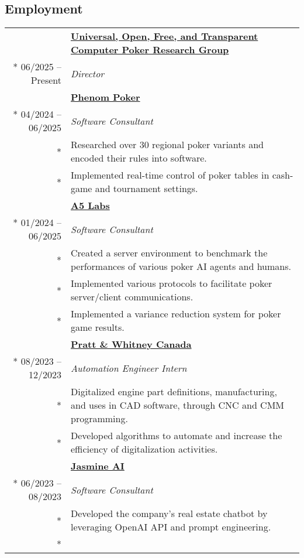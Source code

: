 \documentclass{article}
\begin{document}
	\subsection*{Employment}

	\begin{tabularx}{\textwidth}{r X}
		& \textbf{\href{https://uoftcprg.com/}{Universal, Open, Free, and Transparent Computer Poker Research Group}} \\*
		06/2025 -- Present & \textit{Director} \\
		\addlinespace
		& \textbf{\href{https://www.phenompoker.com/}{Phenom Poker}} \\*
		04/2024 -- 06/2025 & \textit{Software Consultant} \\*
		& {\small Researched over 30 regional poker variants and encoded their rules into software.} \\*
		& {\small Implemented real-time control of poker tables in cash-game and tournament settings.} \\
		\addlinespace
		& \textbf{\href{https://a5labs.co/}{A5 Labs}} \\*
		01/2024 -- 06/2025 & \textit{Software Consultant} \\*
		& {\small Created a server environment to benchmark the performances of various poker AI agents and humans.} \\*
		& {\small Implemented various protocols to facilitate poker server/client communications.} \\*
		& {\small Implemented a variance reduction system for poker game results.} \\
		\addlinespace
		& \textbf{\href{https://www.prattwhitney.com/}{Pratt \& Whitney Canada}} \\*
		08/2023 -- 12/2023 & \textit{Automation Engineer Intern} \\*
		& {\small Digitalized engine part definitions, manufacturing, and uses in CAD software, through CNC and CMM programming.} \\*
		& {\small Developed algorithms to automate and increase the efficiency of digitalization activities.} \\
		\iftoggle{verbose}{
			\addlinespace
			& \textbf{\href{https://jasminechatbot.com/}{Jasmine AI}} \\*
			06/2023 -- 08/2023 & \textit{Software Consultant} \\*
			& {\small Developed the company's real estate chatbot by leveraging OpenAI API and prompt engineering.} \\*
}
\end{tabularx}
\end{document}
